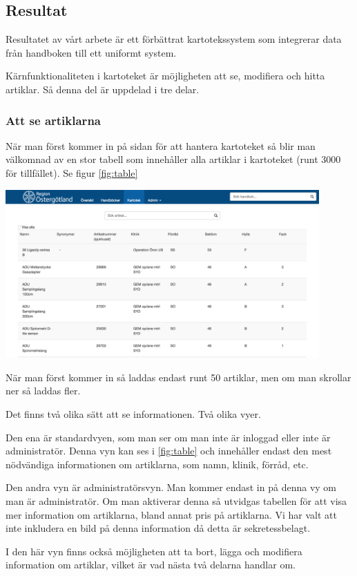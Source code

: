 \clearpage
\subsection{Resultat}
Resultatet av vårt arbete är ett förbättrat kartotekssystem
som integrerar data från handboken till ett
uniformt system.

Kärnfunktionaliteten i kartoteket är möjligheten att se, modifiera och hitta artiklar.
Så denna del är uppdelad i tre delar.

\subsubsection{Att se artiklarna}
När man först kommer in på sidan för att hantera kartoteket så
blir man välkomnad av en stor tabell som innehåller alla artiklar
i kartoteket (runt 3000 för tillfället). Se figur \ref{fig:table}
\begin{center}
  \includegraphics[width=0.9\textwidth]{../images/kartotek1.png}
  \label{fig:table}
\end{center}
När man först kommer in så laddas endast runt 50 artiklar, men
om man skrollar ner så laddas fler.

Det finns två olika sätt att se informationen.
Två olika vyer.

Den ena är standardvyen, som man ser om man inte är inloggad
eller inte är administratör. Denna vyn kan ses i \ref{fig:table}
och innehåller endast den mest nödvändiga informationen om
artiklarna, som namn, klinik, förråd, etc.

Den andra vyn är administratörsvyn.
Man kommer endast in på denna vy om man är administratör.
Om man aktiverar denna så utvidgas tabellen för att
visa mer information om artiklarna, bland annat pris på artiklarna.
Vi har valt att inte inkludera en bild på denna information
då detta är sekretessbelagt.

I den här vyn finns också möjligheten att ta bort, lägga och modifiera
information om artiklar, vilket är vad nästa två delarna handlar om.

